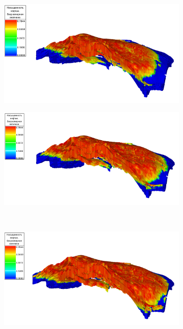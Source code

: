 \documentclass[a4paper,12pt]{article}
\begin{document}
\begin{figure}[H]
	\begin{subfigure}[t]{\dimexpr.5\linewidth-1.3em\relax}
		\centering
		\includegraphics[width=.95\linewidth]{saturation_1_model_1}
	\end{subfigure}
\hfill %
	\begin{subfigure}[t]{\dimexpr.5\linewidth-1.3em\relax}
		\centering
		\includegraphics[width=.95\linewidth]{saturation_2_model_1}
	\end{subfigure}
\\[20pt]
\begin{subfigure}[t]{\dimexpr.5\linewidth-1.3em\relax}
	\centering
	\includegraphics[width=.95\linewidth]{saturation_3_model_1}

\end{subfigure}
\end{figure}
\end{document}
